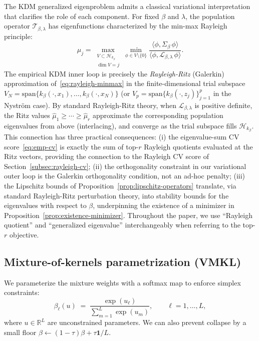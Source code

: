 \documentclass[11pt]{article}
\theoremstyle{remark}
\begin{document}
The KDM generalized eigenproblem admits a classical variational interpretation that clarifies the role of each component.
For fixed $\beta$ and $\lambda$, the population operator $\mathcal{T}_{\beta,\lambda}$ has eigenfunctions characterized by the min-max Rayleigh principle:
\begin{equation}
\label{eq:rayleigh-minmax}
\mu_j
=
\max_{\substack{V\subset\mathcal{H}_{k_\beta}\\ \dim V = j}}
\min_{\phi\in V\setminus\{0\}}
\frac{\langle \phi, \Sigma_\beta\, \phi\rangle}{\langle \phi, \mathcal{L}_{\beta,\lambda}\,\phi\rangle}.
\end{equation}
The empirical KDM inner loop is precisely the \emph{Rayleigh-Ritz} (Galerkin) approximation of~\eqref{eq:rayleigh-minmax} in the finite-dimensional trial subspace $V_N = \mathrm{span}\{k_\beta(\cdot,x_1),\ldots,k_\beta(\cdot,x_N)\}$ (or $V_p = \mathrm{span}\{k_\beta(\cdot,z_j)\}_{j=1}^p$ in the Nystr\"om case).
By standard Rayleigh-Ritz theory, when $\mathcal{L}_{\beta,\lambda}$ is positive definite, the Ritz values $\widehat\mu_1\ge\cdots\ge\widehat\mu_r$ approximate the corresponding population eigenvalues from above (interlacing), and converge as the trial subspace fills $\mathcal{H}_{k_\beta}$.
This connection has three practical consequences:
(i) the eigenvalue-sum CV score~\eqref{eq:emp-cv} is exactly the sum of top-$r$ Rayleigh quotients evaluated at the Ritz vectors, providing the connection to the Rayleigh CV score of Section~\ref{subsec:rayleigh-cv};
(ii) the orthogonality constraint in our variational outer loop is the Galerkin orthogonality condition, not an ad-hoc penalty; 
(iii) the Lipschitz bounds of Proposition~\ref{prop:lipschitz-operators} translate, via standard Rayleigh-Ritz perturbation theory, into stability bounds for the eigenvalues with respect to $\beta$, underpinning the existence of a minimizer in Proposition~\ref{prop:existence-minimizer}.
Throughout the paper, we use ``Rayleigh quotient'' and ``generalized eigenvalue'' interchangeably when referring to the top-$r$ objective.

\subsection{Mixture-of-kernels parametrization (VMKL)}
\label{subsec:vmkl}

We parameterize the mixture weights with a softmax map to enforce simplex constraints:
\begin{equation}
\beta_\ell(u) \;=\; \frac{\exp(u_\ell)}{\sum_{m=1}^L \exp(u_m)}, \qquad \ell=1,\dots,L,
\label{eq:softmax}
\end{equation}
where $u\in\mathbb{R}^L$ are unconstrained parameters.
We can also prevent collapse by a small floor $\beta \leftarrow (1-\tau)\beta + \tau\mathbf{1}/L$.
\end{document}

